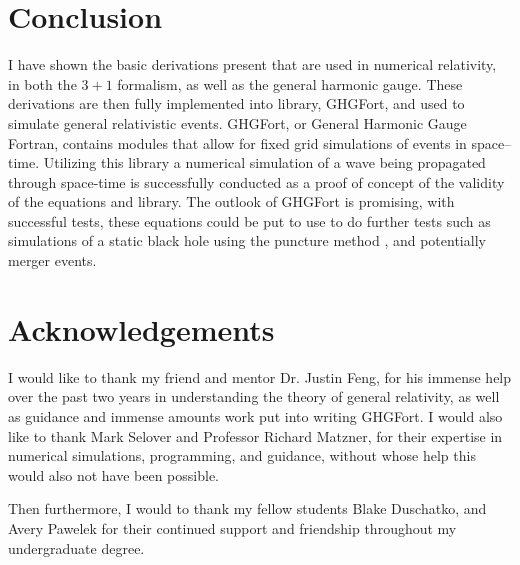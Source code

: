 \documentclass[11pt]{article}
\numberwithin{equation}{section}
\begin{document}
\section{Conclusion}
I have shown the basic derivations present that are used in numerical relativity, in both the $3+1$ formalism, as well as the general harmonic gauge. These derivations are then fully implemented into library, GHGFort, and used to simulate general relativistic events. GHGFort, or General Harmonic Gauge Fortran, contains modules that allow for fixed grid simulations of events in space--time. Utilizing this library a numerical simulation of a wave being propagated through space-time is successfully conducted as a proof of concept of the validity of the equations and library. The outlook of GHGFort is promising, with successful tests, these equations could be put to use to do further tests such as simulations of a static black hole using the puncture method \cite{PhysRevLett.95.121101}, and potentially merger events.

\section{Acknowledgements} 
I would like to thank my friend and mentor Dr. Justin Feng, for his immense help over the past two years in understanding the theory of general relativity, as well as guidance and immense amounts work put into writing GHGFort. I would also like to thank Mark Selover and Professor Richard Matzner, for their expertise in numerical simulations, programming, and guidance, without whose help this would also not have been possible.

Then furthermore, I would to thank my fellow students Blake Duschatko, and Avery Pawelek for their continued support and friendship throughout my undergraduate degree. 




\end{document}

